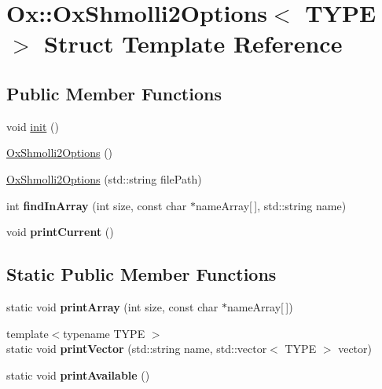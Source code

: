 \hypertarget{struct_ox_1_1_ox_shmolli2_options}{\section{Ox\-:\-:Ox\-Shmolli2\-Options$<$ T\-Y\-P\-E $>$ Struct Template Reference}
\label{struct_ox_1_1_ox_shmolli2_options}
}
\subsection*{Public Member Functions}
\begin{DoxyCompactItemize}
\item 
void \hyperlink{struct_ox_1_1_ox_shmolli2_options_acce1d90b3eb30ca8e4f5fb8be06c3f91}{init} ()
\item 
\hyperlink{struct_ox_1_1_ox_shmolli2_options_a81aad36850e99c356e3b5f233a9e0855}{Ox\-Shmolli2\-Options} ()
\item 
\hyperlink{struct_ox_1_1_ox_shmolli2_options_aa5a93b94a818977544d53ae6c2c0ad58}{Ox\-Shmolli2\-Options} (std\-::string file\-Path)
\item 
\hypertarget{struct_ox_1_1_ox_shmolli2_options_ad59929485ff559a31fea7b9c978a3d75}{int {\bfseries find\-In\-Array} (int size, const char $\ast$name\-Array\mbox{[}$\,$\mbox{]}, std\-::string name)}\label{struct_ox_1_1_ox_shmolli2_options_ad59929485ff559a31fea7b9c978a3d75}

\item 
\hypertarget{struct_ox_1_1_ox_shmolli2_options_a3fb6955eff588d0d8362da359d21a80b}{void {\bfseries print\-Current} ()}\label{struct_ox_1_1_ox_shmolli2_options_a3fb6955eff588d0d8362da359d21a80b}

\end{DoxyCompactItemize}
\subsection*{Static Public Member Functions}
\begin{DoxyCompactItemize}
\item 
\hypertarget{struct_ox_1_1_ox_shmolli2_options_acaceb3fdcdf45ddfed9b75e552f837eb}{static void {\bfseries print\-Array} (int size, const char $\ast$name\-Array\mbox{[}$\,$\mbox{]})}\label{struct_ox_1_1_ox_shmolli2_options_acaceb3fdcdf45ddfed9b75e552f837eb}

\item 
\hypertarget{struct_ox_1_1_ox_shmolli2_options_a3c6cb56b0ec443ce0e55201fb6b918a4}{{\footnotesize template$<$typename T\-Y\-P\-E $>$ }\\static void {\bfseries print\-Vector} (std\-::string name, std\-::vector$<$ T\-Y\-P\-E $>$ vector)}\label{struct_ox_1_1_ox_shmolli2_options_a3c6cb56b0ec443ce0e55201fb6b918a4}

\item 
\hypertarget{struct_ox_1_1_ox_shmolli2_options_ad3377423f40bb5e4d6f82080cdf8c90b}{static void {\bfseries print\-Available} ()}\label{struct_ox_1_1_ox_shmolli2_options_ad3377423f40bb5e4d6f82080cdf8c90b}

\end{DoxyCompactItemize}
